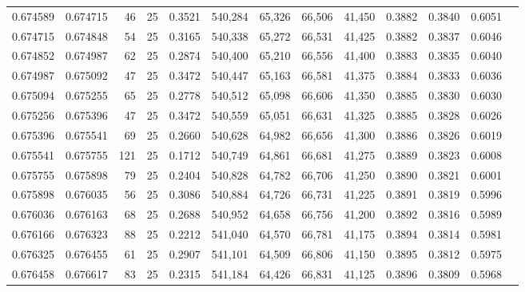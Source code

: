 \begin{tabular}{rrrrrrrrrrrrr}
0.674589 & 0.674715 &    46 &  25 &                                     0.3521 & 540,284 &  65,326 &  66,506 &  41,450 & 0.3882 & 0.3840 & 0.6051 \\
0.674715 & 0.674848 &    54 &  25 &                                     0.3165 & 540,338 &  65,272 &  66,531 &  41,425 & 0.3882 & 0.3837 & 0.6046 \\
0.674852 & 0.674987 &    62 &  25 &                                     0.2874 & 540,400 &  65,210 &  66,556 &  41,400 & 0.3883 & 0.3835 & 0.6040 \\
0.674987 & 0.675092 &    47 &  25 &                                     0.3472 & 540,447 &  65,163 &  66,581 &  41,375 & 0.3884 & 0.3833 & 0.6036 \\
0.675094 & 0.675255 &    65 &  25 &                                     0.2778 & 540,512 &  65,098 &  66,606 &  41,350 & 0.3885 & 0.3830 & 0.6030 \\
0.675256 & 0.675396 &    47 &  25 &                                     0.3472 & 540,559 &  65,051 &  66,631 &  41,325 & 0.3885 & 0.3828 & 0.6026 \\
0.675396 & 0.675541 &    69 &  25 &                                     0.2660 & 540,628 &  64,982 &  66,656 &  41,300 & 0.3886 & 0.3826 & 0.6019 \\
0.675541 & 0.675755 &   121 &  25 &                                     0.1712 & 540,749 &  64,861 &  66,681 &  41,275 & 0.3889 & 0.3823 & 0.6008 \\
0.675755 & 0.675898 &    79 &  25 &                                     0.2404 & 540,828 &  64,782 &  66,706 &  41,250 & 0.3890 & 0.3821 & 0.6001 \\
0.675898 & 0.676035 &    56 &  25 &                                     0.3086 & 540,884 &  64,726 &  66,731 &  41,225 & 0.3891 & 0.3819 & 0.5996 \\
0.676036 & 0.676163 &    68 &  25 &                                     0.2688 & 540,952 &  64,658 &  66,756 &  41,200 & 0.3892 & 0.3816 & 0.5989 \\
0.676166 & 0.676323 &    88 &  25 &                                     0.2212 & 541,040 &  64,570 &  66,781 &  41,175 & 0.3894 & 0.3814 & 0.5981 \\
0.676325 & 0.676455 &    61 &  25 &                                     0.2907 & 541,101 &  64,509 &  66,806 &  41,150 & 0.3895 & 0.3812 & 0.5975 \\
0.676458 & 0.676617 &    83 &  25 &                                     0.2315 & 541,184 &  64,426 &  66,831 &  41,125 & 0.3896 & 0.3809 & 0.5968 \\

\end{tabular}
